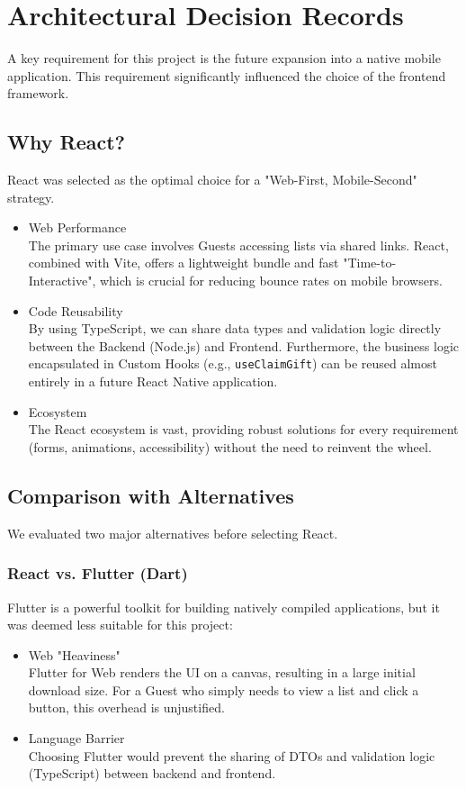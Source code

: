 \section{Architectural Decision Records}
A key requirement for this project is the future expansion into a native mobile application. This requirement significantly influenced the choice of the frontend framework.

\subsection{Why React?}
React was selected as the optimal choice for a "Web-First, Mobile-Second" strategy.
\begin{itemize}
    \item Web Performance \\
        The primary use case involves Guests accessing lists via shared links. React, combined with Vite, offers a lightweight bundle and fast "Time-to-Interactive", which is crucial for reducing bounce rates on mobile browsers.
    \item Code Reusability \\
        By using TypeScript, we can share data types and validation logic directly between the Backend (Node.js) and Frontend. Furthermore, the business logic encapsulated in Custom Hooks (e.g., \texttt{useClaimGift}) can be reused almost entirely in a future React Native application.
    \item Ecosystem \\
        The React ecosystem is vast, providing robust solutions for every requirement (forms, animations, accessibility) without the need to reinvent the wheel.
\end{itemize}

\subsection{Comparison with Alternatives}
We evaluated two major alternatives before selecting React.

\subsubsection{React vs. Flutter (Dart)}
Flutter is a powerful toolkit for building natively compiled applications, but it was deemed less suitable for this project:
\begin{itemize}
    \item Web "Heaviness" \\
        Flutter for Web renders the UI on a canvas, resulting in a large initial download size. For a Guest who simply needs to view a list and click a button, this overhead is unjustified.
    \item Language Barrier \\
        Choosing Flutter would prevent the sharing of DTOs and validation logic (TypeScript) between backend and frontend.
\end{itemize}

